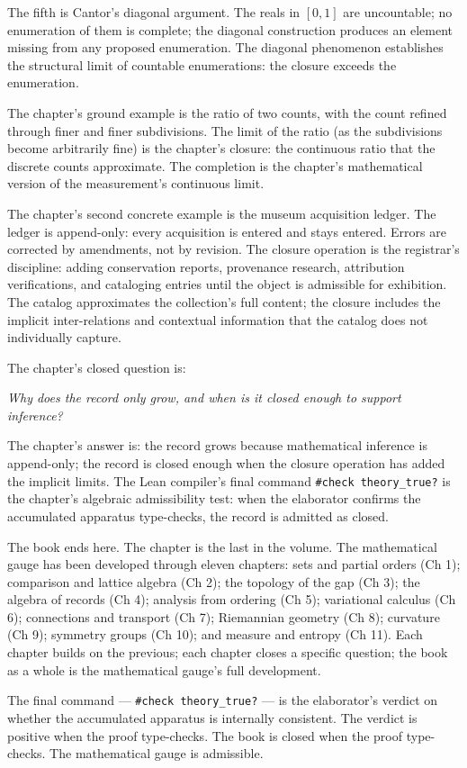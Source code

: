 \begin{chapteressay}
The fifth is Cantor's diagonal argument. The reals in $[0, 1]$
are uncountable; no enumeration of them is complete; the
diagonal construction produces an element missing from any
proposed enumeration. The diagonal phenomenon establishes the
structural limit of countable enumerations: the closure exceeds
the enumeration.

The chapter's ground example is the ratio of two counts, with
the count refined through finer and finer subdivisions. The
limit of the ratio (as the subdivisions become arbitrarily
fine) is the chapter's closure: the continuous ratio that the
discrete counts approximate. The completion is the chapter's
mathematical version of the measurement's continuous limit.

The chapter's second concrete example is the museum acquisition
ledger. The ledger is append-only: every acquisition is entered
and stays entered. Errors are corrected by amendments, not by
revision. The closure operation is the registrar's discipline:
adding conservation reports, provenance research, attribution
verifications, and cataloging entries until the object is
admissible for exhibition. The catalog approximates the
collection's full content; the closure includes the implicit
inter-relations and contextual information that the catalog
does not individually capture.

The chapter's closed question is:

\begin{center}
\emph{Why does the record only grow, and when is it closed enough
to support inference?}
\end{center}

The chapter's answer is: the record grows because mathematical
inference is append-only; the record is closed enough when the
closure operation has added the implicit limits. The Lean
compiler's final command \texttt{\#check theory\_true?} is the
chapter's algebraic admissibility test: when the elaborator
confirms the accumulated apparatus type-checks, the record is
admitted as closed.

The book ends here. The chapter is the last in the volume. The
mathematical gauge has been developed through eleven chapters:
sets and partial orders (Ch 1); comparison and lattice algebra
(Ch 2); the topology of the gap (Ch 3); the algebra of records
(Ch 4); analysis from ordering (Ch 5); variational calculus
(Ch 6); connections and transport (Ch 7); Riemannian geometry
(Ch 8); curvature (Ch 9); symmetry groups (Ch 10); and measure
and entropy (Ch 11). Each chapter builds on the previous; each
chapter closes a specific question; the book as a whole is the
mathematical gauge's full development.

The final command --- \texttt{\#check theory\_true?} --- is the
elaborator's verdict on whether the accumulated apparatus is
internally consistent. The verdict is positive when the proof
type-checks. The book is closed when the proof type-checks. The
mathematical gauge is admissible.

\end{chapteressay}

